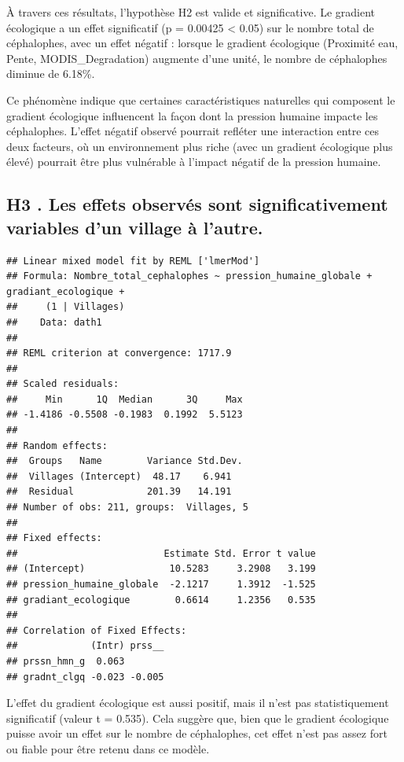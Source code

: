 \documentclass[
]{book}
\begin{document}
À travers ces résultats, l'hypothèse H2 est valide et significative. Le gradient écologique a un effet significatif (p = 0.00425 \textless{} 0.05) sur le nombre total de céphalophes, avec un effet négatif : lorsque le gradient écologique (Proximité eau, Pente, MODIS\_Degradation) augmente d'une unité, le nombre de céphalophes diminue de 6.18\%.

Ce phénomène indique que certaines caractéristiques naturelles qui composent le gradient écologique influencent la façon dont la pression humaine impacte les céphalophes. L'effet négatif observé pourrait refléter une interaction entre ces deux facteurs, où un environnement plus riche (avec un gradient écologique plus élevé) pourrait être plus vulnérable à l'impact négatif de la pression humaine.

\subsection{H3 . Les effets observés sont significativement variables d'un village à l'autre.}\label{h3-.-les-effets-observuxe9s-sont-significativement-variables-dun-village-uxe0-lautre.}

\begin{verbatim}
## Linear mixed model fit by REML ['lmerMod']
## Formula: Nombre_total_cephalophes ~ pression_humaine_globale + gradiant_ecologique +  
##     (1 | Villages)
##    Data: dath1
## 
## REML criterion at convergence: 1717.9
## 
## Scaled residuals: 
##     Min      1Q  Median      3Q     Max 
## -1.4186 -0.5508 -0.1983  0.1992  5.5123 
## 
## Random effects:
##  Groups   Name        Variance Std.Dev.
##  Villages (Intercept)  48.17    6.941  
##  Residual             201.39   14.191  
## Number of obs: 211, groups:  Villages, 5
## 
## Fixed effects:
##                          Estimate Std. Error t value
## (Intercept)               10.5283     3.2908   3.199
## pression_humaine_globale  -2.1217     1.3912  -1.525
## gradiant_ecologique        0.6614     1.2356   0.535
## 
## Correlation of Fixed Effects:
##             (Intr) prss__
## prssn_hmn_g  0.063       
## gradnt_clgq -0.023 -0.005
\end{verbatim}

L'effet du gradient écologique est aussi positif, mais il n'est pas statistiquement significatif (valeur t = 0.535). Cela suggère que, bien que le gradient écologique puisse avoir un effet sur le nombre de céphalophes, cet effet n'est pas assez fort ou fiable pour être retenu dans ce modèle.
\end{document}
